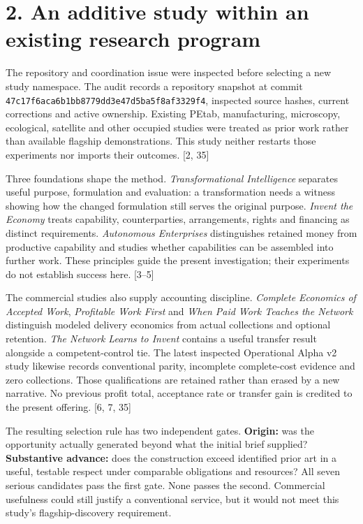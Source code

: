 \documentclass[
  11pt,
]{article}
\begin{document}
\hypertarget{an-additive-study-within-an-existing-research-program}{%
\section{2. An additive study within an existing research
program}\label{an-additive-study-within-an-existing-research-program}}

The repository and coordination issue were inspected before selecting a
new study namespace. The audit records a repository snapshot at commit
\nolinkurl{47c17f6aca6b1bb8779dd3e47d5ba5f8af3329f4}, inspected source
hashes, current corrections and active ownership. Existing PEtab,
manufacturing, microscopy, ecological, satellite and other occupied
studies were treated as prior work rather than available flagship
demonstrations. This study neither restarts those experiments nor
imports their outcomes. {[}2, 35{]}

Three foundations shape the method. \emph{Transformational Intelligence}
separates useful purpose, formulation and evaluation: a transformation
needs a witness showing how the changed formulation still serves the
original purpose. \emph{Invent the Economy} treats capability,
counterparties, arrangements, rights and financing as distinct
requirements. \emph{Autonomous Enterprises} distinguishes retained money
from productive capability and studies whether capabilities can be
assembled into further work. These principles guide the present
investigation; their experiments do not establish success here.
{[}3--5{]}

The commercial studies also supply accounting discipline. \emph{Complete
Economics of Accepted Work}, \emph{Profitable Work First} and \emph{When
Paid Work Teaches the Network} distinguish modeled delivery economics
from actual collections and optional retention. \emph{The Network Learns
to Invent} contains a useful transfer result alongside a
competent-control tie. The latest inspected Operational Alpha v2 study
likewise records conventional parity, incomplete complete-cost evidence
and zero collections. Those qualifications are retained rather than
erased by a new narrative. No previous profit total, acceptance rate or
transfer gain is credited to the present offering. {[}6, 7, 35{]}

The resulting selection rule has two independent gates. \textbf{Origin:}
was the opportunity actually generated beyond what the initial brief
supplied? \textbf{Substantive advance:} does the construction exceed
identified prior art in a useful, testable respect under comparable
obligations and resources? All seven serious candidates pass the first
gate. None passes the second. Commercial usefulness could still justify
a conventional service, but it would not meet this study's
flagship-discovery requirement.
\end{document}
